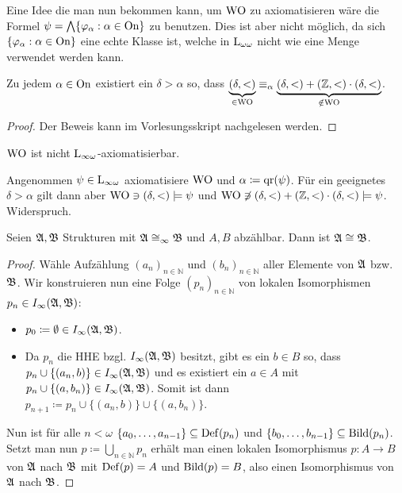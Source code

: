 Eine Idee die man nun bekommen kann, um $\operatorname{WO}$ zu axiomatisieren wäre die Formel $\psi=\bigwedge\{\varphi_\alpha : \alpha\in \operatorname{On}\}$ zu benutzen. Dies ist aber nicht möglich, da sich $\{\varphi_\alpha : \alpha\in \operatorname{On}\}$ eine echte Klasse ist, welche in $\operatorname{L}_{\omega\omega}$ nicht wie eine Menge verwendet werden kann.

\begin{satz}
	Zu jedem $\alpha\in \operatorname{On}$ existiert ein $\delta>\alpha$ so, dass $\underbrace{(\delta,<)}_{\in \operatorname{WO}} \equiv_\alpha \underbrace{(\delta,<)+(\mathbb{Z},<)\cdot(\delta,<)}_{\notin\operatorname{WO}}$.
\end{satz}
\begin{proof}
	Der Beweis kann im Vorlesungsskript nachgelesen werden.
\end{proof}

\begin{satz}
	$\operatorname{WO}$ ist nicht $\operatorname{L}_{\infty\omega}$-axiomatisierbar.
\end{satz}
\begin{satz}
	Angenommen $\psi\in \operatorname{L}_{\infty\omega}$ axiomatisiere $\operatorname{WO}$ und $\alpha\coloneqq \operatorname{qr}(\psi)$. Für ein geeignetes $\delta > \alpha$ gilt dann aber $\operatorname{WO}\ni (\delta,<)\models \psi$ und $\operatorname{WO} \not\ni (\delta,<)+(\mathbb{Z},<)\cdot(\delta,<)\models \psi$. Widerspruch. 
\end{satz}

\begin{satz}
	Seien $\mathfrak{A},\mathfrak{B}$ Strukturen mit $\mathfrak{A} \cong_\infty \mathfrak{B}$ und $A, B$ abzählbar. Dann ist $\mathfrak{A}\cong \mathfrak{B}$.
\end{satz}
\begin{proof}
	Wähle Aufzählung $(a_n)_{n\in \mathbb{N}}$ und $(b_n)_{n\in \mathbb{N}}$ aller Elemente von $\mathfrak{A}$ bzw. $\mathfrak{B}$. Wir konstruieren nun eine Folge $(p_n)_{n\in \mathbb{N}}$ von lokalen Isomorphismen $p_n\in I_\infty(\mathfrak{A},\mathfrak{B})$:
	\begin{itemize}
		\item $p_0\coloneqq \emptyset\in I_\infty(\mathfrak{A},\mathfrak{B})$.
		\item Da $p_n$ die HHE bzgl. $I_\infty(\mathfrak{A},\mathfrak{B})$ besitzt, gibt es ein $b\in B$ so, dass $p_n\cup\{(a_n,b)\}\in I_\infty(\mathfrak{A},\mathfrak{B})$ und es existiert ein $a\in A$ mit $p_n\cup\{(a,b_n)\}\in I_\infty(\mathfrak{A},\mathfrak{B})$. Somit ist dann $p_{n+1}\coloneqq p_n\cup\{(a_n,b)\}\cup \{(a,b_n)\}$.
	\end{itemize}
	Nun ist für alle $n<\omega$ $\{a_0,\dots,a_{n-1}\}\subseteq \operatorname{Def}(p_n)$ und $\{b_0,\dots,b_{n-1}\}\subseteq \operatorname{Bild}(p_n)$. Setzt man nun $p\coloneqq \bigcup_{n\in \mathbb{N}} p_n$ erhält man einen lokalen Isomorphismus $p:A\to B$ von $\mathfrak{A}$ nach $\mathfrak{B}$ mit $\operatorname{Def}(p)=A$ und $\operatorname{Bild}(p)=B$, also einen Isomorphismus von $\mathfrak{A}$ nach $\mathfrak{B}$.
\end{proof}

